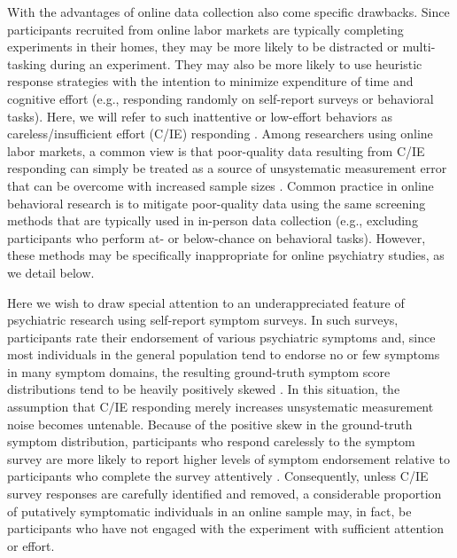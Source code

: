 \documentclass[a4paper,notitlepage,12pt]{article}
\begin{document}
With the advantages of online data collection also come specific drawbacks. Since participants recruited from online labor markets are typically completing experiments in their homes, they may be more likely to be distracted or multi-tasking during an experiment. They may also be more likely to use heuristic response strategies with the intention to minimize expenditure of time and cognitive effort (e.g., responding randomly on self-report surveys or behavioral tasks). Here, we will refer to such inattentive or low-effort behaviors as careless/insufficient effort (C/IE) responding \cite{huang2012detecting, curran2016methods}. Among researchers using online labor markets, a common view is that poor-quality data resulting from C/IE responding can simply be treated as a source of unsystematic measurement error that can be overcome with increased sample sizes \cite{gillan2016taking, chandler2020participant}. Common practice in online behavioral research is to mitigate poor-quality data using the same screening methods that are typically used in in-person data collection (e.g., excluding participants who perform at- or below-chance on behavioral tasks). However, these methods may be specifically inappropriate for online psychiatry studies, as we detail below.

Here we wish to draw special attention to an underappreciated feature of psychiatric research using self-report symptom surveys. In such surveys, participants rate their endorsement of various psychiatric symptoms and, since most individuals in the general population tend to endorse no or few symptoms in many symptom domains, the resulting ground-truth symptom score distributions tend to be heavily positively skewed \cite{lowe2008validation, tomitaka2018distributional}. In this situation, the assumption that C/IE responding merely increases unsystematic measurement noise becomes untenable. Because of the positive skew in the ground-truth symptom distribution, participants who respond carelessly to the symptom survey are more likely to report higher levels of symptom endorsement relative to participants who complete the survey attentively \cite{chandler2020participant, ophir2020turker, king2018random}. Consequently, unless C/IE survey responses are carefully identified and removed, a considerable proportion of putatively symptomatic individuals in an online sample may, in fact, be participants who have not engaged with the experiment with sufficient attention or effort.
\end{document}
